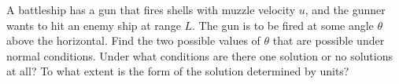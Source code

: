 A battleship has a gun that fires shells with muzzle velocity $u$,
and the gunner wants to hit an enemy ship at range $L$. The gun is
to be fired at some angle $\theta$ above the horizontal. Find the
two possible values of $\theta$ that are possible under normal conditions. Under what conditions are there
one solution or no solutions at all? To what extent is the form of
the solution determined by units?

